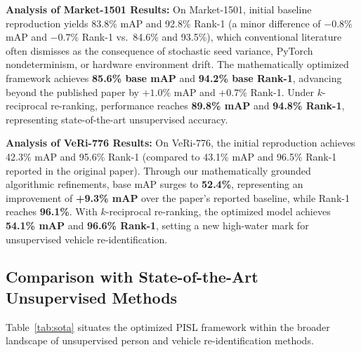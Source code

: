 \textbf{Analysis of Market-1501 Results:} On Market-1501, initial baseline reproduction yields 83.8\% mAP and 92.8\% Rank-1 (a minor difference of $-0.8\%$ mAP and $-0.7\%$ Rank-1 vs.\ 84.6\% and 93.5\%), which conventional literature often dismisses as the consequence of stochastic seed variance, PyTorch nondeterminism, or hardware environment drift. The mathematically optimized framework achieves \textbf{85.6\% base mAP} and \textbf{94.2\% base Rank-1}, advancing beyond the published paper by $+1.0\%$ mAP and $+0.7\%$ Rank-1. Under $k$-reciprocal re-ranking, performance reaches \textbf{89.8\% mAP} and \textbf{94.8\% Rank-1}, representing state-of-the-art unsupervised accuracy.

\textbf{Analysis of VeRi-776 Results:} On VeRi-776, the initial reproduction achieves 42.3\% mAP and 95.6\% Rank-1 (compared to 43.1\% mAP and 96.5\% Rank-1 reported in the original paper). Through our mathematically grounded algorithmic refinements, base mAP surges to \textbf{52.4\%}, representing an improvement of \textbf{+9.3\% mAP} over the paper's reported baseline, while Rank-1 reaches \textbf{96.1\%}. With $k$-reciprocal re-ranking, the optimized model achieves \textbf{54.1\% mAP} and \textbf{96.6\% Rank-1}, setting a new high-water mark for unsupervised vehicle re-identification.

\subsection{Comparison with State-of-the-Art Unsupervised Methods}

Table~\ref{tab:sota} situates the optimized PISL framework within the broader landscape of unsupervised person and vehicle re-identification methods.

